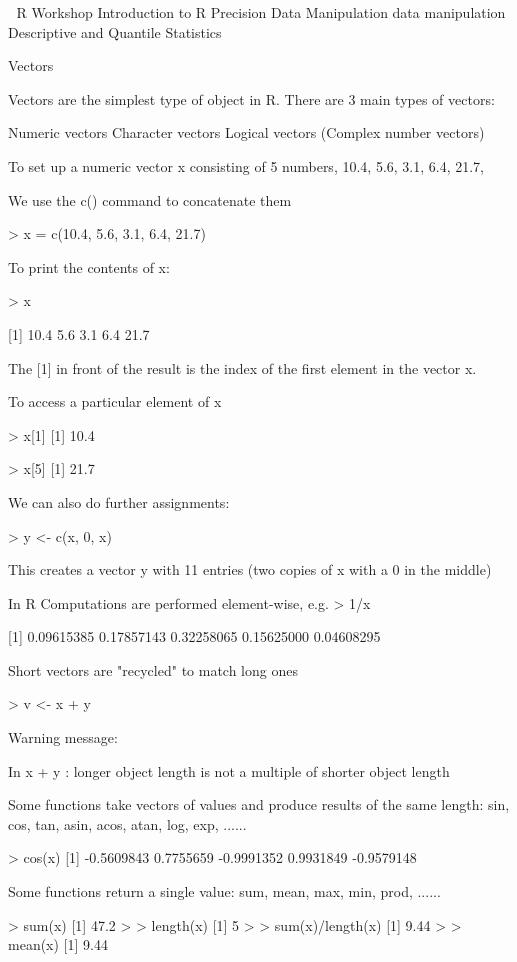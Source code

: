 

R Workshop
Introduction to R
Precision
Data Manipulation
data manipulation
Descriptive and Quantile Statistics
 
Vectors

Vectors are the simplest type of object in R. There are 3 main types of vectors:

  Numeric vectors
  Character vectors
  Logical vectors
  (Complex number vectors)

To set up a numeric vector x consisting of 5 numbers, 10.4, 5.6, 3.1, 6.4, 21.7, 

We use the c() command to concatenate them

> x = c(10.4, 5.6, 3.1, 6.4, 21.7)


To print the contents of x:

> x

[1] 10.4 5.6 3.1 6.4 21.7

The [1] in front of the result is the index of the first element in the vector x.

To access a particular element of x

> x[1]
[1] 10.4

> x[5]
[1] 21.7

We can also do further assignments:

> y <- c(x, 0, x)

This creates a vector y with 11 entries (two copies of x with a 0 in the middle)

 In R Computations are performed element-wise, e.g.
> 1/x

[1] 0.09615385 0.17857143 0.32258065 0.15625000 0.04608295



  Short vectors are "recycled" to match long ones

> v <- x + y

Warning message:

In x + y : longer object length is not a multiple of shorter object length


 
Some functions take vectors of values and produce results of the same length:
sin, cos, tan, asin, acos, atan, log, exp, ......

> cos(x)
[1] -0.5609843 0.7755659 -0.9991352 0.9931849 -0.9579148



 Some functions return a single value:
sum, mean, max, min, prod, ......

> sum(x)
[1] 47.2
>
> length(x)
[1] 5
>
> sum(x)/length(x)
[1] 9.44
>
> mean(x)
[1] 9.44

